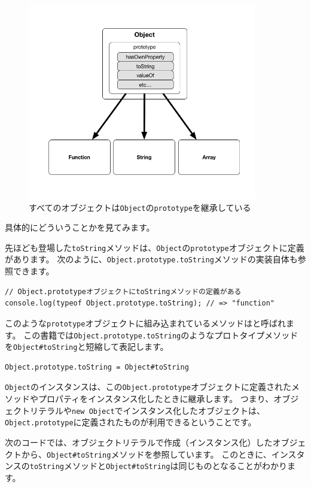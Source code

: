\begin{figure}
\centering
\includegraphics[width=100mm]{./fig/object-prototype.png}
\caption{すべてのオブジェクトは\texttt{Object}の\texttt{prototype}を継承している}
\end{figure}

具体的にどういうことかを見てみます。

先ほども登場した\texttt{toString}メソッドは、\texttt{Object}の\texttt{prototype}オブジェクトに定義があります。
次のように、\texttt{Object.prototype.toString}メソッドの実装自体も参照できます。

\begin{lstlisting}
// Object.prototypeオブジェクトにtoStringメソッドの定義がある
console.log(typeof Object.prototype.toString); // => "function"
\end{lstlisting}

このような\texttt{prototype}オブジェクトに組み込まれているメソッドは\textbf{}と呼ばれます。
この書籍では\texttt{Object.prototype.toString}のようなプロトタイプメソッドを\texttt{Object\#toString}と短縮して表記します。

\begin{lstlisting}
Object.prototype.toString = Object#toString
\end{lstlisting}

\texttt{Object}のインスタンスは、この\texttt{Object.prototype}オブジェクトに定義されたメソッドやプロパティをインスタンス化したときに継承します。
つまり、オブジェクトリテラルや\texttt{new Object}でインスタンス化したオブジェクトは、\texttt{Object.prototype}に定義されたものが利用できるということです。

次のコードでは、オブジェクトリテラルで作成（インスタンス化）したオブジェクトから、\texttt{Object\#toString}メソッドを参照しています。
このときに、インスタンスの\texttt{toString}メソッドと\texttt{Object\#toString}は同じものとなることがわかります。

